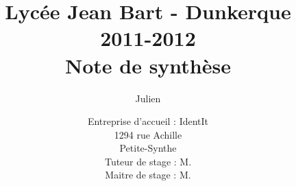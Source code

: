 \documentclass[12pt,a4paper,draft]{report}
\title
{
	\normalsize{Lycée Jean Bart - Dunkerque\\
	2011-2012}\\
	\vspace{15mm}
	\Huge{Note de synthèse}
}
\author{\bsc{Stechele} Julien\\
	\vspace{45mm}
}
\date{
	\normalsize{Entreprise d'accueil : IdentIt\\
    1294 rue Achille \bsc{Pérès}\\
	Petite-Synthe\\
	\vspace{5mm}
    Tuteur de stage : M.\bsc{Anselin}\\
	Maitre de stage : M.\bsc{Dubourg}
	}
}
\begin{document}
\maketitle

\begin{onehalfspace}



\tableofcontents
\clearpage














\end{onehalfspace}
\end{document}
